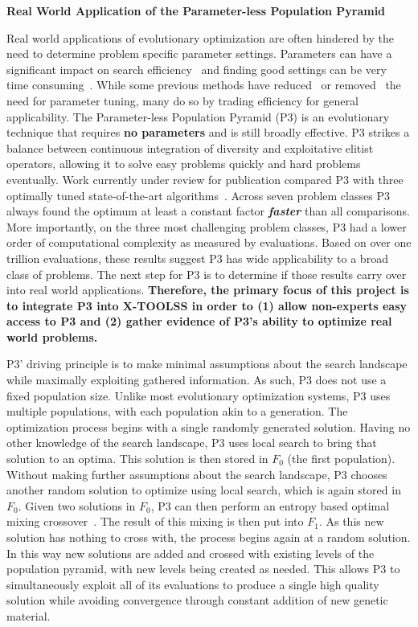 \documentclass{article}
\begin{document}
\begin{center}
\textbf{Real World Application of the Parameter-less Population Pyramid}
\end{center}

Real world applications of evolutionary optimization are often
hindered by the need to determine problem specific parameter
settings.  
Parameters can have a significant impact on search efficiency~\cite{goldberg:1991:gasize}
and finding good settings can be very time consuming~\cite{grefenstette:1986:optimalga}.
While some previous methods have reduced~\cite{Back:1992:selfadapt}
or removed~\cite{pelikan:2004:parameterlesshboa} the
need for parameter tuning, many do so by trading efficiency for
general applicability.  The Parameter-less Population Pyramid (P3)
is an evolutionary technique that requires \textbf{no parameters}
and is still broadly effective. P3 strikes a balance between
continuous integration of diversity and exploitative elitist
operators, allowing it to solve easy problems quickly and hard
problems eventually.  Work currently under review for publication
compared P3 with three optimally tuned state-of-the-art algorithms~\cite{thierens:2013:ltgahiff,doerr:2013:lambdalambda}.
Across seven problem classes P3 always found the
optimum at least a constant factor \emph{\textbf{faster}} than all comparisons.
More importantly, on the three most challenging problem classes,
P3 had a lower order of computational complexity as measured by
evaluations.  Based on over one trillion evaluations, these results
suggest P3 has wide applicability to a broad class of
problems.  The next step for P3 is to determine if those results carry over into real world
applications.  \textbf{Therefore, the primary focus of this project is to integrate
P3 into X-TOOLSS in order to (1) allow non-experts easy access to P3 and
(2) gather evidence of P3's ability to optimize real world problems.}

P3' driving principle is to make
minimal assumptions about the search landscape while maximally
exploiting gathered information.  As such, P3 does not use a fixed
population size.  Unlike most evolutionary optimization systems, P3 uses multiple
populations, with each population akin to a generation. 
The optimization process begins with a single randomly generated solution.
Having no other knowledge of the search landscape, P3 uses local search
to bring that solution to an optima.  This solution is then stored in $F_0$
(the first population).  Without making further assumptions
about the search landscape, P3 chooses another random solution to optimize using
local search, which is again stored in $F_0$.  Given two solutions in $F_0$, P3 can then
perform an entropy based optimal mixing crossover~\cite{bosman:2011:lsbbo}.  The
result of this mixing is then put into $F_1$.  As this new solution has nothing
to cross with, the process begins again at a random solution.  In this way new
solutions are added and crossed with existing levels of the population pyramid,
with new levels being created as needed.  This allows P3 to simultaneously exploit
all of its evaluations to produce a single high quality solution while avoiding convergence through
constant addition of new genetic material.
\end{document}
